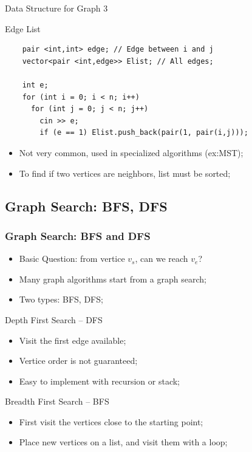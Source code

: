 \begin{frame}[fragile]{Data Structure for Graph 3}
  \begin{block}{Edge List}
    {\smaller
    \begin{verbatim}
    pair <int,int> edge; // Edge between i and j
    vector<pair <int,edge>> Elist; // All edges;

    int e;
    for (int i = 0; i < n; i++)
      for (int j = 0; j < n; j++)
        cin >> e;
        if (e == 1) Elist.push_back(pair(1, pair(i,j)));
    \end{verbatim}}
    \begin{itemize}
      \item Not very common, used in specialized algorithms (ex:MST);
      \item To find if two vertices are neighbors, list must be sorted;
    \end{itemize}
  \end{block}
\end{frame}


\subsection{Graph Search: BFS, DFS}
\begin{frame}
  \frametitle{Graph Search: BFS and DFS}
    \begin{itemize}
    \item Basic Question: from vertice $v_s$, can we reach $v_e$?
    \item Many graph algorithms start from a graph search;
    \item Two types: BFS, DFS;
    \end{itemize}

  \begin{block}{Depth First Search -- DFS}
    \begin{itemize}
      \item Visit the first edge available;
      \item Vertice order is not guaranteed;
      \item Easy to implement with recursion or stack;
    \end{itemize}
  \end{block}

  \begin{block}{Breadth First Search -- BFS}
    \begin{itemize}
      \item First visit the vertices close to the starting point;
      \item Place new vertices on a list, and visit them with a loop;
    \end{itemize}
  \end{block}
\end{frame}

